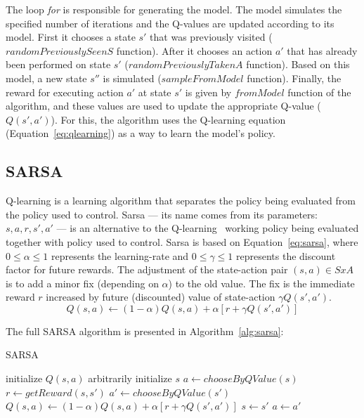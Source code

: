 The loop \textit{for} is responsible for generating the model.
The model simulates the specified number of iterations and the Q-values are updated according to its model.
First it chooses a state $s'$ that was previously visited ($randomPreviouslySeenS$ function).
After it chooses an action $a'$ that has already been performed on state $s'$ ($randomPreviouslyTakenA$ function).
Based on this model, a new state $s''$ is simulated ($sampleFromModel$ function).
Finally, the reward for executing action $a'$ at state $s'$ is given by $fromModel$ function of the algorithm, and these values are used to update the appropriate Q-value ($Q(s',a')$).
For this, the algorithm uses the Q-learning equation (Equation~\ref{eq:qlearning}) as a way to learn the model's policy.



\subsection{SARSA}
\label{subsec:sarsa}

Q-learning is a learning algorithm that separates the policy being evaluated from the policy used to control.
Sarsa --- its name comes from its parameters: $s,a,r,s',a'$ --- is an alternative to the Q-learning~\cite{graepel2004learningfight,stone2005reinforcement}
working policy being evaluated together with policy used to control.
Sarsa is based on Equation~\ref{eq:sarsa}, where $0 \leq \alpha \leq 1$ represents the learning-rate and $0 \leq \gamma \leq 1$ represents the discount factor for future rewards.
The adjustment of the state-action pair $(s,a) \in SxA$ is to add a minor fix (depending on $\alpha$) to the old value.
The fix is the immediate reward $r$ increased by future (discounted) value of state-action $\gamma Q(s',a')$.
\begin{equation} \label{eq:sarsa}
	Q(s,a) \leftarrow (1 - \alpha) Q(s,a) + \alpha[r + \gamma Q(s',a')]
\end{equation}

The full SARSA algorithm is presented in Algorithm~\ref{alg:sarsa}:

\begin{algorithm}
	\caption{SARSA}
	\label{alg:sarsa}
	\begin{algorithmic}[1]
		\STATE initialize $Q(s,a)$ arbitrarily
			\STATE initialize $s$
			\STATE $a \gets chooseByQValue(s)$
				\STATE $r \gets getReward(s,s')$
				\STATE $a' \gets chooseByQValue(s')$
				\STATE $Q(s,a) \gets (1 - \alpha) Q(s,a) + \alpha[r + \gamma Q(s',a')]$
				\STATE $s \gets s'$
				\STATE $a \gets a'$
			\ENDFOR
		\ENDFOR
	\end{algorithmic}
\end{algorithm}

